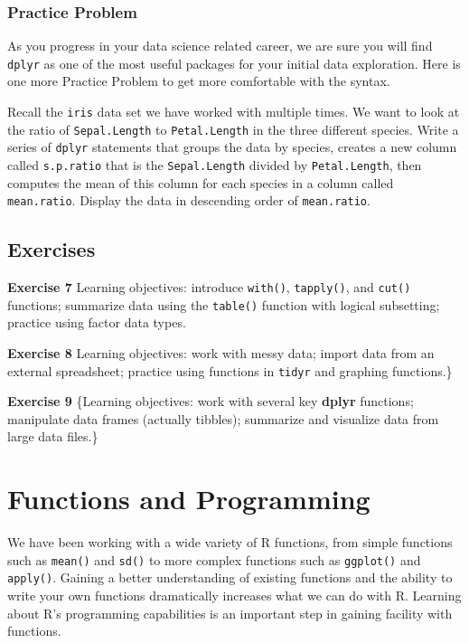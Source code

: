 \documentclass[
]{krantz}
\begin{document}
\hypertarget{practice-problem-10}{%
\subsection{Practice Problem}\label{practice-problem-10}}

As you progress in your data science related career, we are sure you will find \texttt{dplyr} as one of the most useful packages for your initial data exploration. Here is one more Practice Problem to get more comfortable with the syntax.

Recall the \texttt{iris} data set we have worked with multiple times. We want to look at the ratio of \texttt{Sepal.Length} to \texttt{Petal.Length} in the three different species. Write a series of \texttt{dplyr} statements that groups the data by species, creates a new column called \texttt{s.p.ratio} that is the \texttt{Sepal.Length} divided by \texttt{Petal.Length}, then computes the mean of this column for each species in a column called \texttt{mean.ratio}. Display the data in descending order of \texttt{mean.ratio}.

\hypertarget{exercises-3}{%
\section{Exercises}\label{exercises-3}}

\textbf{Exercise 7} Learning objectives: introduce \texttt{with()}, \texttt{tapply()}, and \texttt{cut()} functions; summarize data using the \texttt{table()} function with logical subsetting; practice using factor data types.

\textbf{Exercise 8} Learning objectives: work with messy data; import data from an external spreadsheet; practice using functions in \texttt{tidyr} and graphing functions.\}

\textbf{Exercise 9} \{Learning objectives: work with several key \textbf{dplyr} functions; manipulate data frames (actually tibbles); summarize and visualize data from large data files.\}

\hypertarget{functions}{%
\chapter{Functions and Programming}\label{functions}}

We have been working with a wide variety of R functions, from simple functions such as \texttt{mean()} and \texttt{sd()} to more complex functions such as \texttt{ggplot()} and \texttt{apply()}. Gaining a better understanding of existing functions and the ability to write your own functions dramatically increases what we can do with R. Learning about R's programming capabilities is an important step in gaining facility with functions.
\end{document}
